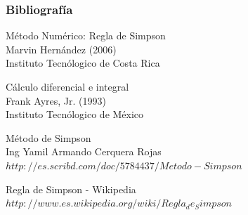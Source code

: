 \documentclass{beamer}
\begin{document}
\begin{frame}
  \frametitle{Bibliografía}

  \begin{thebibliography}{10}

    \beamertemplatebookbibitems
    Método Numérico: Regla de Simpson \\
    Marvin Hernández (2006) \\
    Instituto Tecnólogico de Costa Rica

    \beamertemplatebookbibitems
    Cálculo diferencial e integral \\
    Frank Ayres, Jr. (1993) \\
    Instituto Tecnólogico de México

    \beamertemplatebookbibitems
    Método de Simpson \\
    Ing Yamil Armando Cerquera Rojas \\
    {\small $http://es.scribd.com/doc/5784437/Metodo-Simpson$}


    \beamertemplatebookbibitems
    Regla de Simpson - Wikipedia \\
    {\small $http://www.es.wikipedia.org/wiki/Regla_de_Simpson$}
    

  \end{thebibliography}
\end{frame}


\end{document}
